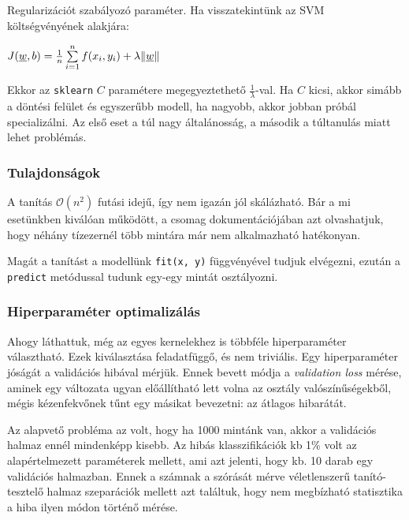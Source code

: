 Regularizációt\cite{sklearn.regularization} szabályozó paraméter. Ha visszatekintünk az SVM költségvényének alakjára:

$ J(\underline{w},b)  = \frac{1}{n} \sum\limits_{i=1}^{n} 
f(x_i, y_i) + \lambda \lVert\underline{w}\rVert $

\noindent
Ekkor az \texttt{sklearn} $ C $ paramétere megegyeztethető $ \frac{1}{\lambda} $-val.
Ha $ C $ kicsi, akkor simább a döntési felület és egyszerűbb modell, ha nagyobb, akkor 
jobban próbál specializálni. Az első eset a túl nagy általánosság, a második a túltanulás
miatt lehet problémás.




\subsubsection{Tulajdonságok}

\noindent
A tanítás $ \mathcal{O}(n^2) $ futási idejű, így nem igazán jól skálázható. Bár a mi 
esetünkben kiválóan működött, a csomag dokumentációjában azt olvashatjuk, hogy néhány tízezernél
több mintára már nem alkalmazható hatékonyan.


Magát a tanítást a modellünk \texttt{fit(x, y)} függvényével tudjuk elvégezni, ezután 
a \texttt{predict} metódussal tudunk egy-egy mintát osztályozni.



\subsubsection{Hiperparaméter optimalizálás}
\label{sec:svm.hiperparameter.optimalizalas}

Ahogy láthattuk, még az egyes kernelekhez is többféle hiperparaméter választható. Ezek kiválasztása
feladatfüggő, és nem triviális. Egy hiperparaméter jóságát a validációs hibával mérjük. Ennek 
bevett módja a \textit{validation loss} mérése, aminek egy változata ugyan előállítható lett volna 
az osztály valószínűségekből, mégis kézenfekvőnek tűnt egy másikat bevezetni: az átlagos hibarátát.

Az alapvető probléma az volt, hogy ha 1000 mintánk van, akkor a validációs halmaz ennél mindenképp
kisebb. Az hibás klasszifikációk kb 1\% volt az alapértelmezett paraméterek mellett, ami azt
jelenti, hogy kb. 10 darab egy validációs halmazban. Ennek a számnak a szórását mérve véletlenszerű
tanító-tesztelő halmaz szeparációk mellett azt találtuk, hogy nem megbízható statisztika a 
hiba ilyen módon történő mérése.

